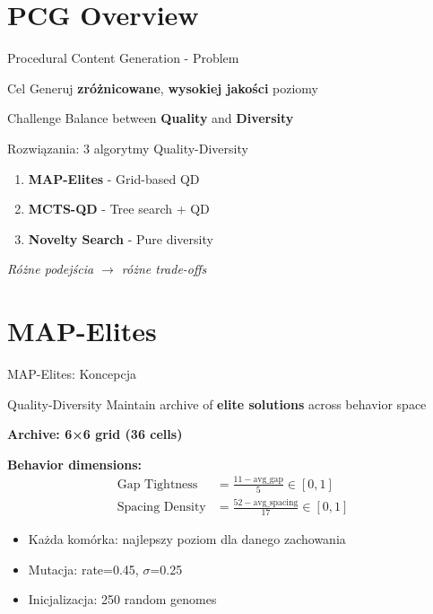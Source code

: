 \documentclass{beamer}
\begin{document}
\section{PCG Overview}

\begin{frame}{Procedural Content Generation - Problem}
\begin{block}{Cel}
Generuj \textbf{zróżnicowane}, \textbf{wysokiej jakości} poziomy
\end{block}

\begin{alertblock}{Challenge}
Balance between \textbf{Quality} and \textbf{Diversity}
\end{alertblock}

\begin{exampleblock}{Rozwiązania: 3 algorytmy Quality-Diversity}
\begin{enumerate}
\item \textbf{MAP-Elites} - Grid-based QD
\item \textbf{MCTS-QD} - Tree search + QD
\item \textbf{Novelty Search} - Pure diversity
\end{enumerate}
\end{exampleblock}

\vspace{0.5cm}
\centering
\textit{Różne podejścia $\rightarrow$ różne trade-offs}
\end{frame}

\section{MAP-Elites}

\begin{frame}{MAP-Elites: Koncepcja}
\begin{block}{Quality-Diversity}
Maintain archive of \textbf{elite solutions} across behavior space
\end{block}

\textbf{Archive: 6×6 grid (36 cells)}

\textbf{Behavior dimensions:}
\begin{align*}
\text{Gap Tightness} &= \frac{11 - \text{avg\_gap}}{5} \in [0,1] \\
\text{Spacing Density} &= \frac{52 - \text{avg\_spacing}}{17} \in [0,1]
\end{align*}

\vspace{0.3cm}
\begin{itemize}
\item Każda komórka: najlepszy poziom dla danego zachowania
\item Mutacja: rate=0.45, $\sigma$=0.25
\item Inicjalizacja: 250 random genomes
\end{itemize}
\end{frame}
\end{document}
